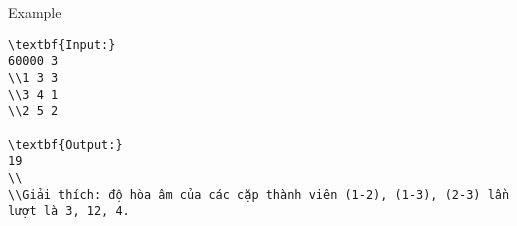 Example
\begin{verbatim}
\textbf{Input:}
60000 3
\\1 3 3
\\3 4 1
\\2 5 2

\textbf{Output:}
19
\\
\\Giải thích: độ hòa âm của các cặp thành viên (1-2), (1-3), (2-3) lần lượt là 3, 12, 4. \end{verbatim}